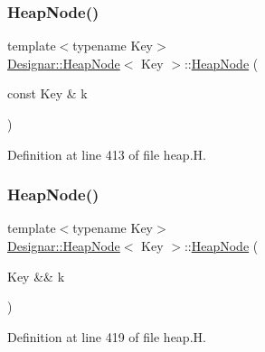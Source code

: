 \subsubsection{\texorpdfstring{Heap\+Node()}{HeapNode()}\hspace{0.1cm}{\footnotesize\ttfamily [2/4]}}
{\footnotesize\ttfamily template$<$typename Key$>$ \\
\hyperlink{class_designar_1_1_heap_node}{Designar\+::\+Heap\+Node}$<$ Key $>$\+::\hyperlink{class_designar_1_1_heap_node}{Heap\+Node} (\begin{DoxyParamCaption}\item[{const Key \&}]{k }\end{DoxyParamCaption})\hspace{0.3cm}{\ttfamily [inline]}}



Definition at line 413 of file heap.\+H.

\mbox{\label{class_designar_1_1_heap_node_a29189c1b5cd10290c2332e40cadbb899}} 
\subsubsection{\texorpdfstring{Heap\+Node()}{HeapNode()}\hspace{0.1cm}{\footnotesize\ttfamily [3/4]}}
{\footnotesize\ttfamily template$<$typename Key$>$ \\
\hyperlink{class_designar_1_1_heap_node}{Designar\+::\+Heap\+Node}$<$ Key $>$\+::\hyperlink{class_designar_1_1_heap_node}{Heap\+Node} (\begin{DoxyParamCaption}\item[{Key \&\&}]{k }\end{DoxyParamCaption})\hspace{0.3cm}{\ttfamily [inline]}}



Definition at line 419 of file heap.\+H.

\mbox{\label{class_designar_1_1_heap_node_aa4287eba82bce2dae37c5e3f4012b1b4}} 
